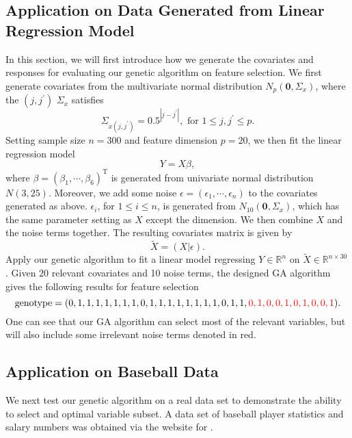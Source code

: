 \documentclass{article}
\begin{document}
\subsection{Application on Data Generated from Linear Regression Model}
In this section, we will first introduce how we generate the covariates and responses for evaluating our genetic algorithm on feature selection. We first generate covariates from the multivariate normal distribution $N_{p}(\bm{0}, \Sigma_{x})$, where the $(j, j^{\prime})$ $\Sigma_{x}$ satisfies
$$
\Sigma_{x(j,j^{\prime})} = 0.5^{|j-j^{\prime}|}, \mbox{ for } 1\leq j, j^{\prime}\leq p.
$$
Setting sample size $n=300$ and feature dimension $p=20$, we then fit the linear regression model
$$
Y = X\beta,
$$
where $\beta=(\beta_{1}, \cdots, \beta_{6})^{\mathrm{T}}$ is generated from univariate normal distribution $N(3, 25)$. Moreover, we add some noise $\epsilon=(\epsilon_{1}, \cdots, \epsilon_{n})$ to the covariates generated as above. $\epsilon_{i}$, for $1\leq i \leq n$, is generated from $N_{10}(\bm{0}, \Sigma_{x})$, which has the same parameter setting as $X$ except the dimension. We then combine $X$ and the noise terms together. The resulting covariates matrix is given by
$$
\tilde{X} = (X|\epsilon).
$$
Apply our genetic algorithm to fit a linear model regressing $Y\in \mathbb{R}^{n}$ on $\tilde{X}\in \mathbb{R}^{n\times 30}$. Given $20$ relevant covariates and 10 noise terms, the designed GA algorithm gives the following results for feature selection
$$
\mbox{genotype}=(0, 1, 1, 1, 1, 1, 1, 1, 0, 1, 1, 1, 1, 1, 1, 1, 1, 0, 1, 1, \textcolor{red}{0, 1, 0, 0, 1, 0, 1, 0, 0, 1}).
$$
One can see that our GA algorithm can select most of the relevant variables, but will also include some irrelevant noise terms denoted in red.


\subsection{Application on Baseball Data}
We next test our genetic algorithm on a real data set to demonstrate the ability to select and optimal variable subset.  A data set of baseball player statistics and salary numbers was obtained via the website for \citet{compute}.
\end{document}
